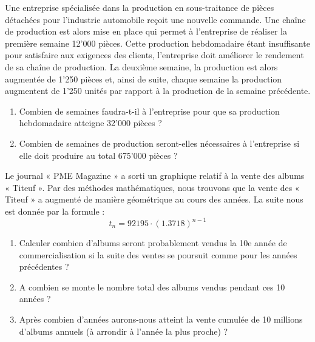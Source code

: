 \begin{exercice}
Une entreprise spécialisée dans la production en sous-traitance de pièces détachées pour l'industrie automobile reçoit une nouvelle commande.
	Une chaîne de production est alors mise en place qui permet à l'entreprise de réaliser la première semaine 12'000 pièces. Cette production hebdomadaire étant insuffisante pour satisfaire aux exigences des clients, l'entreprise doit améliorer le rendement de sa chaîne de production.
	La deuxième semaine, la production est alors augmentée de 1'250 pièces et, ainsi de suite, chaque semaine la production augmentent de 1'250 unités par rapport à la production de la semaine précédente.
\begin{enumerate}
\item Combien de semaines faudra-t-il à l'entreprise pour que sa production hebdomadaire atteigne 32'000 pièces ?
\item Combien de semaines de production seront-elles nécessaires à l'entreprise si elle doit produire au total 675'000 pièces ?
\end{enumerate}
\end{exercice}

\begin{exercice}
Le journal « PME Magazine » a sorti un graphique relatif à la vente des albums  « Titeuf ».
Par des méthodes mathématiques, nous trouvons que la vente des « Titeuf » a augmenté de manière géométrique au cours des années. 
La suite nous est donnée par la formule : \[{{t}_{n}}=92195\cdot {{(1.3718)}^{n-1}}\]
\begin{enumerate}
\item Calculer combien d’albums seront probablement vendus la 10e année de commercialisation si la suite des ventes se poursuit comme pour les années précédentes ?
\item A combien se monte le nombre total des albums vendus pendant ces 10 années ?
\item Après combien d’années aurons-nous atteint la vente cumulée de 10 millions d’albums annuels (à arrondir à l’année la plus proche) ?
\end{enumerate}
\end{exercice}